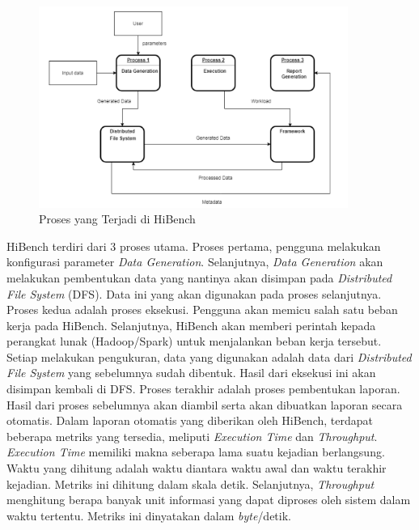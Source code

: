 \begin{figure}[h]
    \centering
    \includegraphics[width=0.9\textwidth]{figures/ch02/hibench-flow}
    \caption{Proses yang Terjadi di HiBench \cite{barosenAnalysisComparisonInterfacing2018}}
    \label{fig:hibench-process-flow}
\end{figure}

HiBench terdiri dari 3 proses utama. Proses pertama, pengguna melakukan konfigurasi parameter \textit{Data Generation}. Selanjutnya, \textit{Data Generation} akan melakukan pembentukan data yang nantinya akan disimpan pada \textit{Distributed File System} (DFS). Data ini yang akan digunakan pada proses selanjutnya. Proses kedua adalah proses eksekusi. Pengguna akan memicu salah satu beban kerja pada HiBench. Selanjutnya, HiBench akan memberi perintah kepada perangkat lunak (Hadoop/Spark) untuk menjalankan beban kerja tersebut. Setiap melakukan pengukuran, data yang digunakan adalah data dari \textit{Distributed File System} yang sebelumnya sudah dibentuk. Hasil dari eksekusi ini akan disimpan kembali di DFS. Proses terakhir adalah proses pembentukan laporan. Hasil dari proses sebelumnya akan diambil serta akan dibuatkan laporan secara otomatis.
Dalam laporan otomatis yang diberikan oleh HiBench, terdapat beberapa metriks yang tersedia, meliputi \textit{Execution Time} dan \textit{Throughput}. \textit{Execution Time} memiliki makna seberapa lama suatu kejadian berlangsung. Waktu yang dihitung adalah waktu diantara waktu awal dan waktu terakhir kejadian. Metriks ini dihitung dalam skala detik. Selanjutnya, \textit{Throughput} menghitung berapa banyak unit informasi yang dapat diproses oleh sistem dalam waktu tertentu. Metriks ini dinyatakan dalam \textit{byte}/detik.


